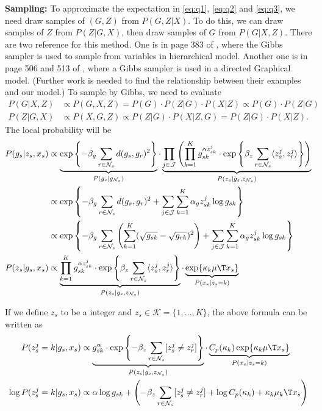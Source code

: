 \documentclass{article}
\begin{document}
\textbf{Sampling:} To approximate the expectation in \eqref{eq:q1}, \eqref{eq:q2} and \eqref{eq:q3}, we need draw samples of $(G, Z)$ from $P(G, Z|X)$. To do this, we can draw samples of $Z$ from $P(Z|G, X)$, then draw samples of $G$ from $P(G|X, Z)$. There are two reference for this method. One is in page 383 of \cite{robert2004monte}, where the Gibbs sampler is used to sample from variables in hierarchical model. Another one is in page 506 and 513 of \cite{koller2009probabilistic}, where a Gibbs sampler is used in a directed Graphical model. (Further work is needed to find the relationship between their examples and our model.) To sample by Gibbs,  we need to evaluate
\begin{align*}
  P(G|X, Z) &\propto P(G, X, Z) = P(G) \cdot P(Z|G) \cdot P(X|Z) \propto P(G) \cdot P(Z|G)\\
  P(Z|G, X) &\propto P(X, G, Z) \propto P(Z|G) \cdot P(X|Z, G) =  P(Z|G) \cdot P(X|Z).
\end{align*}
The local probability will be
\begin{align}
P(g_s|z_s, x_s) &\propto \underbrace{\exp \left \{ -\beta_g \sum_{r \in \mathcal{N}_s} d(g_s, g_r)^2 \right \} }_{P(g_s|g_{\mathcal{N}_s})} \cdot \underbrace{\prod_{j \in \mathcal{J}} \left ( \prod_{k=1}^K g_{sk}^{\alpha z_{sk}^j} \cdot \exp \left \{ \beta_z \sum_{r \in \mathcal{N}_s} \langle z_s^j, z_r^j\rangle \right \} \right )}_{P(z_s | g_s, z_{\mathcal{N}_s}) } \nonumber\\
&\propto \exp \left\{ -\beta_g \sum_{r \in \mathcal{N}_s} d(g_s, g_r)^2 + \sum_{j\in \mathcal{J}} \sum_{k=1}^K \alpha_g z_{sk}^j \log g_{sk} \right\}  \nonumber\\
&\propto \exp \left\{  -\beta_g \sum_{r \in \mathcal{N}_s} \left ( \sum_{k = 1}^K (\sqrt{g_{sk}} - \sqrt{g_{rk}} )^2 \right ) 
 + \sum_{j\in \mathcal{J}} \sum_{k=1}^K \alpha_g z_{sk}^j \log g_{sk} \right\}  \label{eq:condg}\\
P(z_s | g_s, x_s) &\propto \underbrace{\prod_{k=1}^K g_{sk}^{\alpha z_{sk}^j} \cdot \exp \left \{ \beta_z \sum_{r \in \mathcal{N}_s} \langle z_s^j, z_r^j\rangle \right \} }_{P(z_s | g_s, z_{\mathcal{N}_s}) } \cdot \underbrace{  \exp \{ \kappa_k \mu\T x_s \} }_{P(x_s | z_s = k)} \label{eq:condz}
\end{align}

If we define $z_s$ to be a integer and $z_s \in \mathcal{K} = \{1, \dots, K\}$, the above formula can be written as
\begin{align*}
  P(z_s^j = k| g_s, x_s) &\propto \underbrace{ g_{sk}^{\alpha} \cdot \exp \left \{ - \beta_z \sum_{r \in \mathcal{N}_s} [ z_s^j \neq z_r^j] \right \} }_{P(z_s | g_s, z_{\mathcal{N}_s}) } \cdot \underbrace{ C_p(\kappa_k) \exp \{ \kappa_k \mu\T x_s \} }_{P(x_s | z_s = k)} \\
  \log   P(z_s^j = k| g_s, x_s) &\propto \alpha \log g_{sk} + \left ( - \beta_z \sum_{r \in \mathcal{N}_s} [ z_s^j \neq z_r^j] + \log C_p(\kappa_k) + \kappa_k \mu_k\T x_s\right )
\end{align*}
\end{document}
